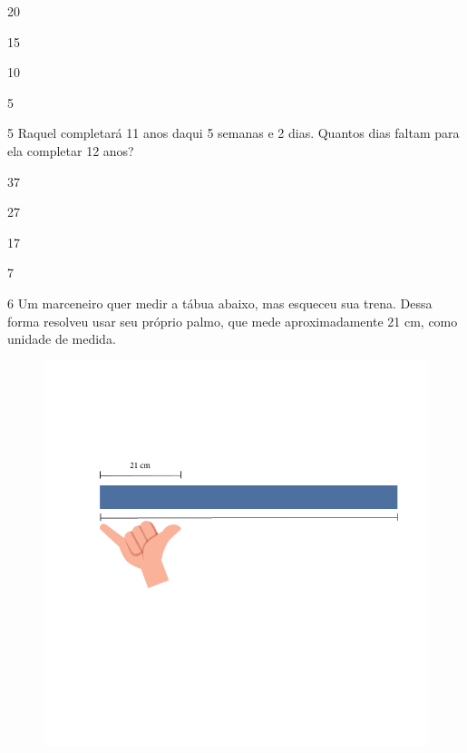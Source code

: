 \begin{minipage}{.5\textwidth}
\begin{escolha}
\item
  20
\item
  15
\item
  10
\item
  5
\end{escolha}
\end{minipage}



\num{5} Raquel completará 11 anos daqui 5 semanas e 2 dias. Quantos dias
faltam para ela completar 12 anos?

\begin{minipage}{.5\textwidth}
\begin{escolha}
\item
  37
\item
  27
\item
  17
\item
  7
\end{escolha}
\end{minipage}

\num{6} Um marceneiro quer medir a tábua abaixo, mas esqueceu sua trena.
Dessa forma resolveu usar seu próprio palmo, que mede aproximadamente 
21 cm, como unidade de medida.

\begin{figure}[htpb!]
\includegraphics[width=\textwidth]{../ilustracoes/MAT5/SAEB_5ANO_MAT_figura117.png}
\end{figure}

